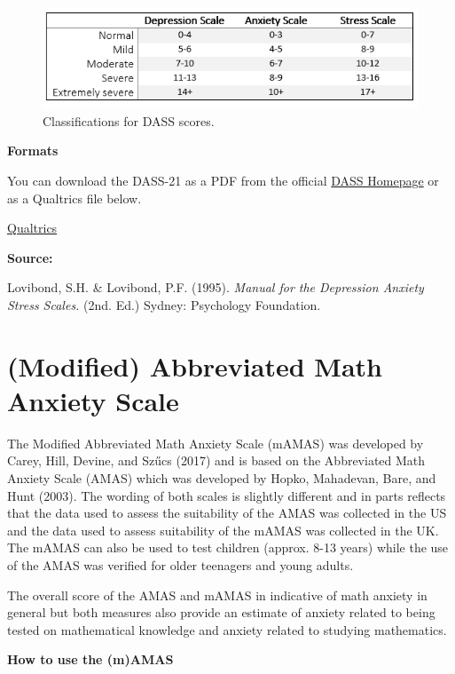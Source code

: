 \documentclass[
]{book}
\begin{document}
\begin{figure}

{\centering \includegraphics[width=0.8\linewidth]{images/DASS_Scoring} 

}

\caption{Classifications for DASS scores.}\label{fig:Figure8-1}
\end{figure}

\textbf{Formats}

You can download the DASS-21 as a PDF from the official \href{http://www2.psy.unsw.edu.au/groups/dass/}{DASS Homepage} or as a Qualtrics file below.

\href{link}{Qualtrics}

\textbf{Source:}

Lovibond, S.H. \& Lovibond, P.F. (1995). \emph{Manual for the Depression Anxiety Stress Scales.} (2nd. Ed.) Sydney: Psychology Foundation.

\hypertarget{modified-abbreviated-math-anxiety-scale}{%
\section{(Modified) Abbreviated Math Anxiety Scale}\label{modified-abbreviated-math-anxiety-scale}}

The Modified Abbreviated Math Anxiety Scale (mAMAS) was developed by Carey, Hill, Devine, and Szűcs (2017) and is based on the Abbreviated Math Anxiety Scale (AMAS) which was developed by Hopko, Mahadevan, Bare, and Hunt (2003). The wording of both scales is slightly different and in parts reflects that the data used to assess the suitability of the AMAS was collected in the US and the data used to assess suitability of the mAMAS was collected in the UK. The mAMAS can also be used to test children (approx. 8-13 years) while the use of the AMAS was verified for older teenagers and young adults.

The overall score of the AMAS and mAMAS in indicative of math anxiety in general but both measures also provide an estimate of anxiety related to being tested on mathematical knowledge and anxiety related to studying mathematics.

\textbf{How to use the (m)AMAS}
\end{document}
